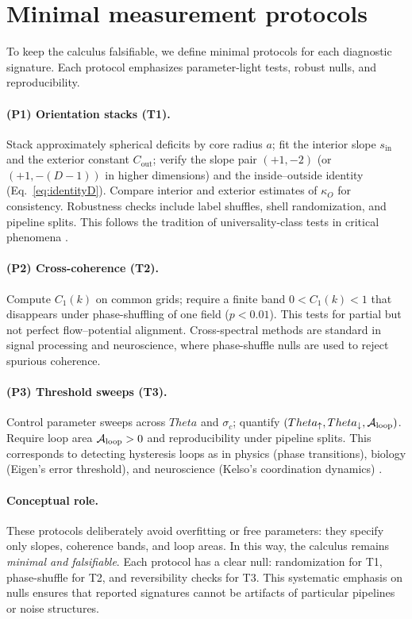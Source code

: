 \documentclass[12pt,a4paper,oneside]{scrreprt}
\def\Theta{Theta}%
\begin{document}
\section{Minimal measurement protocols}\label{sec:ur-protocols}

To keep the calculus falsifiable, we define minimal protocols for each diagnostic signature. 
Each protocol emphasizes parameter-light tests, robust nulls, and reproducibility.

\paragraph{(P1) Orientation stacks (T1).} 
Stack approximately spherical deficits by core radius $a$; 
fit the interior slope $s_{\mathrm{in}}$ and the exterior constant $C_{\mathrm{out}}$; 
verify the slope pair $(+1,-2)$ (or $(+1,-(D{-}1))$ in higher dimensions) 
and the inside–outside identity (Eq.~\eqref{eq:identityD}). 
Compare interior and exterior estimates of $\kappa_O$ for consistency. 
Robustness checks include label shuffles, shell randomization, and pipeline splits. 
This follows the tradition of universality-class tests in critical phenomena 
\citep{Stanley1971Phase}.

\paragraph{(P2) Cross-coherence (T2).} 
Compute $C_1(k)$ on common grids; 
require a finite band $0 < C_1(k) < 1$ that disappears under phase-shuffling 
of one field ($p<0.01$). 
This tests for partial but not perfect flow–potential alignment. 
Cross-spectral methods are standard in signal processing \citep{Bendat2010Random} 
and neuroscience, where phase-shuffle nulls are used to reject spurious coherence.

\paragraph{(P3) Threshold sweeps (T3).} 
Control parameter sweeps across $\Theta$ and $\sigma_c$; 
quantify $(\Theta_\uparrow,\Theta_\downarrow,\mathcal A_{\rm loop})$. 
Require loop area $\mathcal A_{\rm loop} > 0$ and reproducibility under pipeline splits. 
This corresponds to detecting hysteresis loops as in physics (phase transitions), 
biology (Eigen’s error threshold), and neuroscience (Kelso’s coordination dynamics) 
\citep{Eigen1971,Szathmary1995,Kelso1995Coordination}. 

\paragraph{Conceptual role.} 
These protocols deliberately avoid overfitting or free parameters: 
they specify only slopes, coherence bands, and loop areas. 
In this way, the calculus remains \emph{minimal and falsifiable}. 
Each protocol has a clear null: randomization for T1, phase-shuffle for T2, 
and reversibility checks for T3. 
This systematic emphasis on nulls ensures that reported signatures cannot be 
artifacts of particular pipelines or noise structures.
\end{document}
